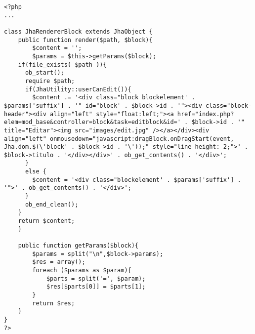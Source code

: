 \begin{lstlisting}[label=jha_renderer_block,caption=Renderizador de bloques.]
<?php
...

class JhaRendererBlock extends JhaObject {
	public function render($path, $block){
		$content = '';
		$params = $this->getParams($block);
    if(file_exists( $path )){
      ob_start();
      require $path;
      if(JhaUtility::userCanEdit()){
        $content .= '<div class="block blockelement' . $params['suffix'] . '" id="block' . $block->id . '"><div class="block-header"><div align="left" style="float:left;"><a href="index.php?elem=mod_base&controller=block&task=editblock&id=' . $block->id . '" title="Editar"><img src="images/edit.jpg" /></a></div><div align="left" onmousedown="javascript:dragBlock.onDragStart(event, Jha.dom.$(\'block' . $block->id . '\'));" style="line-height: 2;">' . $block->titulo . '</div></div>' . ob_get_contents() . '</div>';
      }
      else {
        $content = '<div class="blockelement' . $params['suffix'] . '">' . ob_get_contents() . '</div>';
      }
      ob_end_clean();
    }
    return $content;
	}
	
	public function getParams($block){
		$params = split("\n",$block->params);
		$res = array();
		foreach ($params as $param){
			$parts = split('=', $param);
			$res[$parts[0]] = $parts[1];
		}
		return $res;
	}
}
?>
\end{lstlisting}
